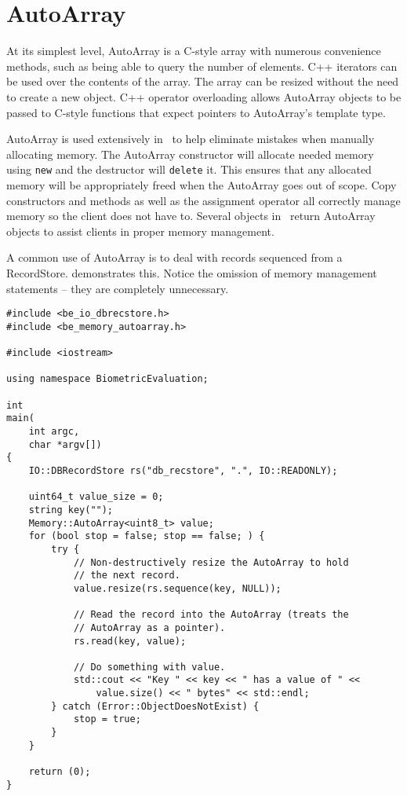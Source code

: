 \section{AutoArray}
\label{sec-autoarray}
At its simplest level, AutoArray is a C-style array with numerous convenience 
methods, such as being able to query the number of elements.  C++ iterators
can be used over the contents of the array.  The array can be resized without
the need to create a new object.  C++ operator overloading allows AutoArray
objects to be passed to C-style functions that expect pointers to AutoArray's
template type.

AutoArray is used extensively in \sname\ to help eliminate mistakes when
manually allocating memory.  The AutoArray constructor will allocate needed
memory using {\tt new} and the destructor will {\tt delete} it.  This ensures
that any allocated memory will be appropriately freed when the AutoArray goes
out of scope.  Copy constructors and methods as well as the assignment operator
all correctly manage memory so the client does not have to.  Several objects in
\sname\ return AutoArray objects to assist clients in proper memory management.

A common use of AutoArray is to deal with records sequenced from a
RecordStore.  demonstrates this.  Notice the
omission of memory management statements -- they are completely unnecessary.

\lstset{language=c++}
\begin{lstlisting}[caption={Using \nameref{sec-autoarray} with RecordStores}, label=autoarrayrsuse]
#include <be_io_dbrecstore.h>
#include <be_memory_autoarray.h>

#include <iostream>

using namespace BiometricEvaluation;

int
main(
    int argc,
    char *argv[])
{
	IO::DBRecordStore rs("db_recstore", ".", IO::READONLY);

	uint64_t value_size = 0;
	string key("");
	Memory::AutoArray<uint8_t> value;
	for (bool stop = false; stop == false; ) {
		try {
			// Non-destructively resize the AutoArray to hold
			// the next record.
			value.resize(rs.sequence(key, NULL));

			// Read the record into the AutoArray (treats the
			// AutoArray as a pointer).
			rs.read(key, value);

			// Do something with value.
			std::cout << "Key " << key << " has a value of " <<
			    value.size() << " bytes" << std::endl;
		} catch (Error::ObjectDoesNotExist) {
			stop = true;
		}
	}

	return (0);
}
\end{lstlisting}

